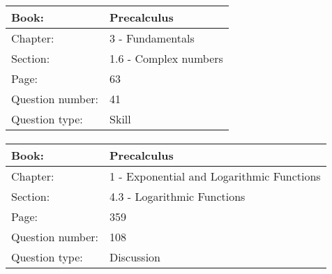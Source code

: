 \documentclass{article}
\begin{document}
   \paragraph{}
   \begin{tabularx}{1\textwidth}{
           p{}
           p{}
       }
       \toprule
       Book: & Precalculus
       \\
       \midrule
       Chapter: & 3 - Fundamentals
       \\
       \midrule
       Section: & 1.6 - Complex numbers
       \\
       \midrule
       Page: & 63
       \\
       \midrule
       Question number: & 41
       \\
       \midrule
       Question type: & Skill
       \\
       \bottomrule
   \end{tabularx}



   \paragraph{}
   \begin{tabularx}{1\textwidth}{
           p{}
           p{}
       }
       \toprule
       Book: & Precalculus
       \\
       \midrule
       Chapter: & 1 - Exponential and Logarithmic Functions
       \\
       \midrule
       Section: & 4.3 - Logarithmic Functions
       \\
       \midrule
       Page: & 359
       \\
       \midrule
       Question number: & 108
       \\
       \midrule
       Question type: & Discussion
       \\
       \bottomrule
   \end{tabularx}
\end{document}
